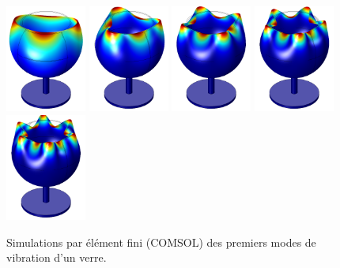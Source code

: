 \documentclass[12pt,a4paper]{article}
\begin{document}
\begin{figure}
\center
\includegraphics[height=100pt]{figures/wine_glass_f0.png}
\hfill
\includegraphics[height=100pt]{figures/wine_glass_f1.png}
\hfill
\includegraphics[height=100pt]{figures/wine_glass_f2.png}
\hfill
\includegraphics[height=100pt]{figures/wine_glass_f3.png}
\hfill
\includegraphics[height=100pt]{figures/wine_glass_f4.png}
\caption{Simulations par élément fini (COMSOL) des premiers modes de vibration d'un verre.}
\label{fig:wine_glass}
\end{figure}
\end{document}
